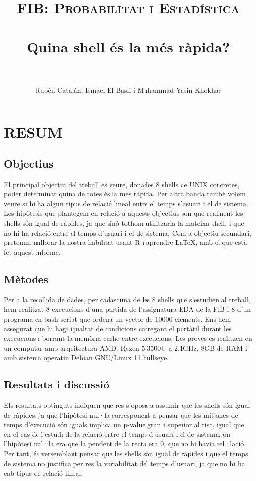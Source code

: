 \documentclass[12pt]{article}
\title{
  \normalfont \normalsize 
  \textsc{FIB: Probabilitat i Estadística} \\ [25pt] 
  \horrule{0.5pt} \\[0.4cm] %
  \huge Quina shell és la més ràpida? \\ %
  \horrule{2pt} \\[0.5cm] %
}
\author{Rubén Catalán, Ismael El Basli i Muhammad Yasin Khokhar}
\begin{document}
\maketitle %

\newpage
\section*{RESUM}
\subsection*{Objectius}
El principal objectiu del treball es veure, donades 8 shells de UNIX concretes, poder determinar quina de totes
és la més ràpida. Per altra banda també volem veure si hi ha algun tipus de relació lineal entre el temps s'usuari
i el de sistema. Les hipòtesis que plantegem en relació a aquests objectius són que realment les shells són igual
de ràpides, ja que sinó tothom utilitzaria la mateixa shell, i que no hi ha relació entre el temps d'usuari i el de sistema.
Com a objectiu secundari, pretenim millorar la nostra habilitat usant R i aprendre \LaTeX, amb el que està fet aquest informe.
\subsection*{Mètodes}
Per a la recollida de dades, per cadascuna de les 8 shells que s'estudien al treball, hem realitzat 8 execucions d'una partida
de l'assignatura EDA de la FIB i 8 d'un programa en bash script que ordena un vector de 10000 elements. Ens hem assegurat que hi 
hagi igualtat de condicions carregant el portàtil durant les execucions i borrant la memòria cache entre execucions. Les proves
es realitzen en un computar amb arquitectura AMD: Ryzen 5 3500U a 2.1GHz, 8GB de RAM i amb sistema operatiu Debian GNU/Linux 11 bullseye.

\subsection*{Resultats i discussió}
Els resultats obtinguts indiquen que res s'oposa a assumir que les shells són igual de ràpides, ja que l'hipòtesi nul·la corresponent
a pensar que les mitjanes de temps d'execució són iguals implica un p-value gran i superior al risc, igual que en el cas de l'estudi de la relació entre el temps
d'usuari i el de sistema, on l'hipòtesi nul·la era que la pendent de la recta era 0, que no hi havia rel·lació. Per tant, és versemblant 
pensar que les shells són igual de ràpides i que el temps de sistema no justifica per res la variabilitat del temps d'usuari, ja que no
hi ha cab tipus de relació lineal.
\end{document}
